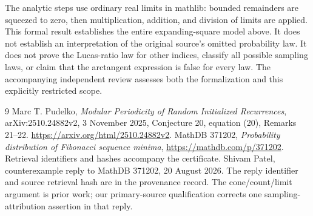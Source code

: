 \documentclass[11pt]{article}
\begin{document}
The analytic steps use ordinary real limits in mathlib: bounded remainders are squeezed to zero, then multiplication, addition, and division of limits are applied. This formal result establishes the entire expanding-square model above. It does not establish an interpretation of the original source's omitted probability law. It does not prove the Lucas-ratio law for other indices, classify all possible sampling laws, or claim that the arctangent expression is false for every law. The accompanying independent review assesses both the formalization and this explicitly restricted scope.

\begin{thebibliography}{9}
 Marc T. Pudelko, \emph{Modular Periodicity of Random Initialized Recurrences}, arXiv:2510.24882v2, 3 November 2025, Conjecture 20, equation (20), Remarks 21--22. \url{https://arxiv.org/html/2510.24882v2}.
 MathDB 371202, \emph{Probability distribution of Fibonacci sequence minima}, \url{https://mathdb.com/p/371202}. Retrieval identifiers and hashes accompany the certificate.
 Shivam Patel, counterexample reply to MathDB 371202, 20 August 2026. The reply identifier and source retrieval hash are in the provenance record. The cone/count/limit argument is prior work; our primary-source qualification corrects one sampling-attribution assertion in that reply.
\end{thebibliography}
\end{document}
